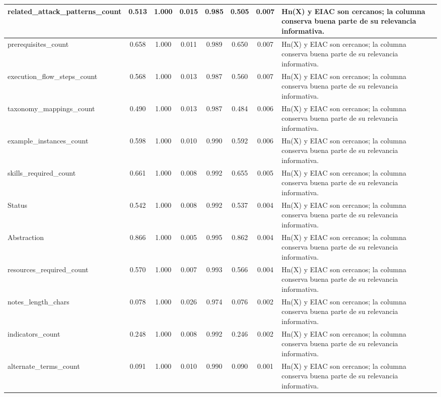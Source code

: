 \begin{table}[h]
\begin{tabular}{|p{3cm}|c|c|c|c|c|c|p{5cm}|}
\hline
related\_attack\_patterns\_count & 0.513 & 1.000 & 0.015 & 0.985 & 0.505 & 0.007 & Hn(X) y EIAC son cercanos; la columna conserva buena parte de su relevancia informativa. \\
\hline
prerequisites\_count & 0.658 & 1.000 & 0.011 & 0.989 & 0.650 & 0.007 & Hn(X) y EIAC son cercanos; la columna conserva buena parte de su relevancia informativa. \\
\hline
execution\_flow\_steps\_count & 0.568 & 1.000 & 0.013 & 0.987 & 0.560 & 0.007 & Hn(X) y EIAC son cercanos; la columna conserva buena parte de su relevancia informativa. \\
\hline
taxonomy\_mappings\_count & 0.490 & 1.000 & 0.013 & 0.987 & 0.484 & 0.006 & Hn(X) y EIAC son cercanos; la columna conserva buena parte de su relevancia informativa. \\
\hline
example\_instances\_count & 0.598 & 1.000 & 0.010 & 0.990 & 0.592 & 0.006 & Hn(X) y EIAC son cercanos; la columna conserva buena parte de su relevancia informativa. \\
\hline
skills\_required\_count & 0.661 & 1.000 & 0.008 & 0.992 & 0.655 & 0.005 & Hn(X) y EIAC son cercanos; la columna conserva buena parte de su relevancia informativa. \\
\hline
Status & 0.542 & 1.000 & 0.008 & 0.992 & 0.537 & 0.004 & Hn(X) y EIAC son cercanos; la columna conserva buena parte de su relevancia informativa. \\
\hline
Abstraction & 0.866 & 1.000 & 0.005 & 0.995 & 0.862 & 0.004 & Hn(X) y EIAC son cercanos; la columna conserva buena parte de su relevancia informativa. \\
\hline
resources\_required\_count & 0.570 & 1.000 & 0.007 & 0.993 & 0.566 & 0.004 & Hn(X) y EIAC son cercanos; la columna conserva buena parte de su relevancia informativa. \\
\hline
notes\_length\_chars & 0.078 & 1.000 & 0.026 & 0.974 & 0.076 & 0.002 & Hn(X) y EIAC son cercanos; la columna conserva buena parte de su relevancia informativa. \\
\hline
indicators\_count & 0.248 & 1.000 & 0.008 & 0.992 & 0.246 & 0.002 & Hn(X) y EIAC son cercanos; la columna conserva buena parte de su relevancia informativa. \\
\hline
alternate\_terms\_count & 0.091 & 1.000 & 0.010 & 0.990 & 0.090 & 0.001 & Hn(X) y EIAC son cercanos; la columna conserva buena parte de su relevancia informativa. \\
\hline
\end{tabular}
\end{table}
